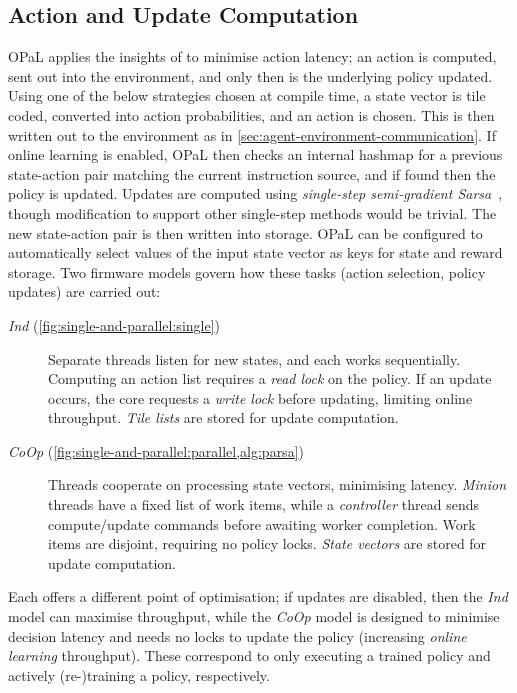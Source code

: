 \documentclass[
sigconf,natbib=false
,anonymous=true
,10pt
]{acmart}
\newcommand{\approachshort}{OPaL}
\newcommand{\Coopfw}{\emph{CoOp}}
\newcommand{\coopfw}{\Coopfw}
\newcommand{\Indfw}{\emph{Ind}}
\newcommand{\indfw}{\Indfw}
\begin{document}
\subsection{Action and Update Computation}\label{sec:action-and-update-computation}
\approachshort{} applies the insights of \textcite{DBLP:journals/firai/TravnikMSP18} to minimise action latency; an action is computed, sent out into the environment, and only then is the underlying policy updated.
Using one of the below strategies chosen at compile time, a state vector is tile coded, converted into action probabilities, and an action is chosen.
This is then written out to the environment as in \cref{sec:agent-environment-communication}.
If online learning is enabled, \approachshort{} then checks an internal hashmap for a previous state-action pair matching the current instruction source, and if found then the policy is updated.
Updates are computed using \emph{single-step semi-gradient Sarsa}~\cite[pp. \numrange{217}{221}]{RL2E}, though modification to support other single-step methods would be trivial.
The new state-action pair is then written into storage.
\approachshort{} can be configured to automatically select values of the input state vector as keys for state and reward storage.
Two firmware models govern how these tasks (action selection, policy updates) are carried out:
\begin{description}
	\item[\Indfw{} (\cref{fig:single-and-parallel:single})] Separate threads listen for new states, and each works sequentially. Computing an action list requires a \emph{read lock} on the policy. If an update occurs, the core requests a \emph{write lock} before updating, limiting online throughput. \emph{Tile lists} are stored for update computation.
	\item[\Coopfw{} (\cref{fig:single-and-parallel:parallel,alg:parsa})] Threads cooperate on processing state vectors, minimising latency. \emph{Minion} threads have a fixed list of work items, while a \emph{controller} thread sends compute/update commands before awaiting worker completion. Work items are disjoint, requiring no policy locks. \emph{State vectors} are stored for update computation.
\end{description}
Each offers a different point of optimisation; if updates are disabled, then the \indfw{} model can maximise throughput, while the \coopfw{} model is designed to minimise decision latency and needs no locks to update the policy (increasing \emph{online learning} throughput).
These correspond to only executing a trained policy and actively (re-)training a policy, respectively.
\end{document}
